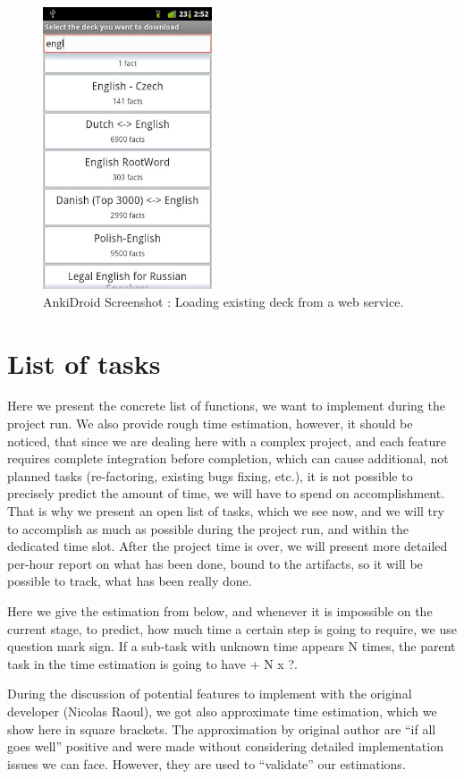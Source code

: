 \documentclass[a4paper,11pt,twoside]{article}
\begin{document}
\begin{figure}[t]
\centering
\label{fig:Downloddeck}
\includegraphics[width=5cm]{Screenshot3}
\caption{AnkiDroid Screenshot : Loading existing deck from a web service.}
\end{figure}




\section{List of tasks}

Here we present the concrete list of functions, we want to implement during the project run.
We also provide rough time estimation, however, it should be noticed, that since we are dealing
here with a complex project, and each feature requires complete integration before completion,
which can cause additional, not planned tasks (re-factoring, existing bugs fixing, etc.),
it is not possible to precisely predict the amount of time, we will have to spend on accomplishment.
That is why we present an open list of tasks, which we see now, and we will try to accomplish as much
as possible during the project run, and within the dedicated time slot. After the project time
is over, we will present more detailed per-hour report on what has been done, bound to the artifacts,
so it will be possible to track, what has been really done.

Here we give the estimation from below, and whenever it is impossible on the current stage,
to predict, how much time a certain step is going to require, we use question mark sign. 
If a sub-task with unknown time appears N times, the parent task in the time estimation
is going to have + N x ?. 

During the discussion of potential features to implement with the original developer (Nicolas Raoul),
we got also approximate time estimation, which we show here in square brackets. The approximation
by original author are ``if all goes well'' positive and were made without considering detailed
implementation issues we can face. However, they are used to ``validate'' our estimations.
\end{document}

